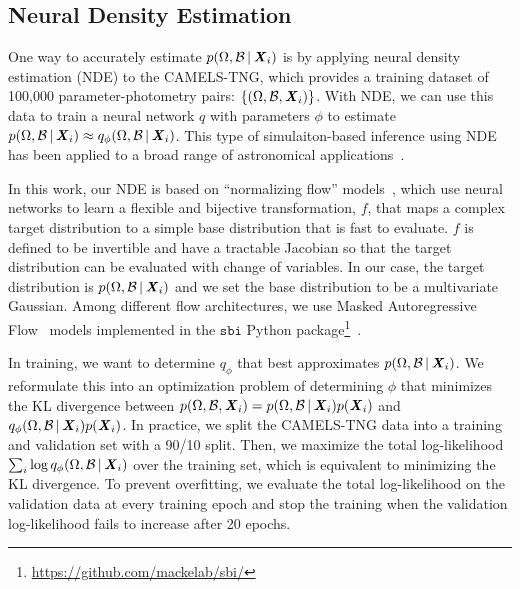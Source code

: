 \subsection{Neural Density Estimation} \label{sec:anpe}
One way to accurately estimate $p(\Omega, \mathcal{B}\,|\, {\textbf{\textit{X}}_i})$ is
by applying neural density estimation (NDE) to the CAMELS-TNG, which provides a
training dataset of 100,000 parameter-photometry pairs: 
$\{(\Omega, \mathcal{B}, {\textbf{\textit{X}}_i})\}$.
With NDE, we can use this data to train a neural network $q$ with parameters
$\phi$ to estimate 
$p(\Omega, \mathcal{B}\,|\, {\textbf{\textit{X}}_i}) \approx
q_\phi(\Omega, \mathcal{B}\,|\, {\textbf{\textit{X}}_i})$.
This type of simulaiton-based inference using NDE has been applied to a broad
range of astronomical applications~\citep[\eg~][]{wong2020, dax2021, zhang2021,
hahn2022a, hahn2022d, hahn2023}. 

In this work, our NDE is based on ``normalizing flow'' models~\citep{tabak2010,
tabak2013}, which use neural networks to learn a flexible and bijective
transformation, $f$, that maps a complex target distribution to a simple base
distribution that is fast to evaluate.
$f$ is defined to be invertible and have a tractable Jacobian so that the 
target distribution can be evaluated with change of variables. 
In our case, the target distribution is 
$p(\Omega, \mathcal{B}\,|\, {\textbf{\textit{X}}_i})$ and we set the base distribution to
be a multivariate Gaussian. 
Among different flow architectures, we use Masked Autoregressive
Flow~\citep[MAF;][]{papamakarios2017} models implemented in the $\mathtt{sbi}$
Python
package\footnote{\url{https://github.com/mackelab/sbi/}}~\citep{greenberg2019,
tejero-cantero2020}.

In training, we want to determine $q_\phi$ that best approximates 
$p(\Omega, \mathcal{B}\,|\, {\textbf{\textit{X}}_i})$. 
We reformulate this into an optimization problem of determining $\phi$
that minimizes the KL divergence between 
$p(\Omega, \mathcal{B}, {\textbf{\textit{X}}_i}) = p(\Omega, \mathcal{B}\,|\, {\textbf{\textit{X}}_i})
 p({\textbf{\textit{X}}_i})$ and
$q_\phi(\Omega, \mathcal{B}\,|\, {\textbf{\textit{X}}_i}) p({\textbf{\textit{X}}_i})$.
In practice, we split the CAMELS-TNG data into a training and validation set
with a 90/10 split.  
Then, we maximize the total log-likelihood 
$\sum_i \log q_{\phi}(\Omega, \mathcal{B}\,|\, {\textbf{\textit{X}}_i})$ over the 
training set, which is equivalent to minimizing the KL divergence. 
To prevent overfitting, we evaluate the total log-likelihood on the validation
data at every training epoch and stop the training when the validation 
log-likelihood fails to increase after 20 epochs.  


